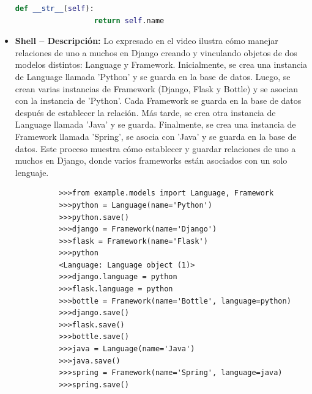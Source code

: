 \documentclass{article}
\begin{document}
\begin{itemize}
\begin{lstlisting}[language=Python]
              def __str__(self):
                  return self.name
        \end{lstlisting}
      \item \textbf{Shell -- Descripción: }Lo expresado en el video ilustra cómo manejar relaciones de uno a muchos en Django creando y 
        vinculando objetos de dos modelos distintos: Language y Framework. Inicialmente, se crea una instancia de Language 
        llamada 'Python' y se guarda en la base de datos. Luego, se crean varias instancias de Framework (Django, Flask y Bottle) 
        y se asocian con la instancia de 'Python'. Cada Framework se guarda en la base de datos después de establecer la relación. 
        Más tarde, se crea otra instancia de Language llamada 'Java' y se guarda. Finalmente, se crea una instancia de Framework 
        llamada 'Spring', se asocia con 'Java' y se guarda en la base de datos. Este proceso muestra cómo establecer y guardar 
        relaciones de uno a muchos en Django, donde varios frameworks están asociados con un solo lenguaje.
        \newline
        \begin{lstlisting}
          >>>from example.models import Language, Framework
          >>>python = Language(name='Python')
          >>>python.save()
          >>>django = Framework(name='Django')
          >>>flask = Framework(name='Flask')
          >>>python
          <Language: Language object (1)>
          >>>django.language = python
          >>>flask.language = python
          >>>bottle = Framework(name='Bottle', language=python)
          >>>django.save()
          >>>flask.save()
          >>>bottle.save()
          >>>java = Language(name='Java')
          >>>java.save()
          >>>spring = Framework(name='Spring', language=java)
          >>>spring.save()
        \end{lstlisting}
    \end{itemize}
  
\end{document}
